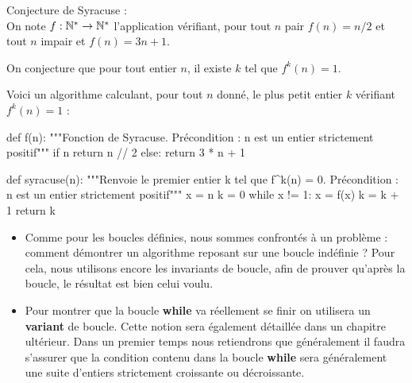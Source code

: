 

\label{ex-syracuse} Conjecture de Syracuse :\\
On note $f : \mathbb{N}^{*} \to \mathbb{N}^{*}$ l'application vérifiant, pour tout $n$ pair
$f(n)=n/2$ et tout $n$ impair et $f(n)=3n+1$.

On conjecture que pour tout entier $n$, il existe $k$ tel que
$f^{k}(n)=1$.

Voici un algorithme calculant, pour tout $n$ donné, le plus petit
entier $k$ vérifiant $f^{k}(n) = 1$ :


\begin{pyverbatim}
def f(n):
    """Fonction de Syracuse.
    Précondition : n est un entier strictement positif"""
    if n %
        return n // 2
    else:
        return 3 * n + 1
        
def syracuse(n):
    """Renvoie le premier entier k tel que  f^k(n) = 0.
    Précondition : n est un entier strictement positif"""
    x = n
    k = 0
    while x != 1:
        x = f(x)
        k = k + 1
    return k
\end{pyverbatim}

\begin{rem}
\begin{itemize}
\item Comme pour les boucles définies, nous sommes confrontés à un problème : comment démontrer un 
algorithme reposant sur une boucle indéfinie ? Pour cela, nous utilisons encore les invariants de 
boucle, afin de prouver qu'après la boucle, le résultat est bien celui voulu.
\item Pour montrer que la boucle \textbf{while} va réellement se finir on utilisera un \textbf{variant} de boucle. Cette notion sera également détaillée dans un chapitre ultérieur. Dans un premier temps nous retiendrons que généralement il faudra s'assurer que la condition contenu dans la boucle \textbf{while} sera généralement une suite d'entiers strictement croissante ou décroissante.
\end{itemize}
\end{rem}


